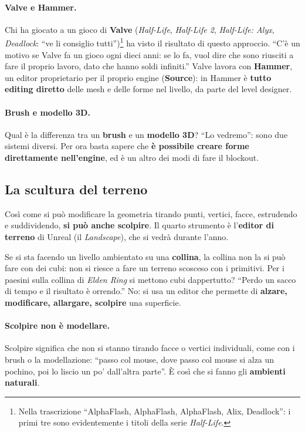\paragraph{Valve e Hammer.} Chi ha giocato a un gioco di \textbf{Valve}
(\emph{Half-Life}, \emph{Half-Life 2}, \emph{Half-Life: Alyx},
\emph{Deadlock}: ``ve li consiglio tutti'')\footnote{Nella trascrizione
``AlphaFlash, AlphaFlash, AlphaFlash, Alix, Deadlock'': i primi tre sono
evidentemente i titoli della serie \emph{Half-Life}.} ha visto il risultato di
questo approccio. ``C'è un motivo se Valve fa un gioco ogni dieci anni: se lo
fa, vuol dire che sono riusciti a fare il proprio lavoro, dato che hanno soldi
infiniti.'' Valve lavora con \textbf{Hammer}, un editor proprietario per il
proprio engine (\textbf{Source}): in Hammer è \textbf{tutto editing diretto}
delle mesh e delle forme nel livello, da parte del level designer.

\paragraph{Brush e modello 3D.} Qual è la differenza tra un \textbf{brush} e un
\textbf{modello 3D}? ``Lo vedremo'': sono due sistemi diversi. Per ora basta
sapere che \textbf{è possibile creare forme direttamente nell'engine}, ed è un
altro dei modi di fare il blockout.

\subsection{La scultura del terreno}
\label{gd11:sec:scultura}

Così come si può modificare la geometria tirando punti, vertici, facce,
estrudendo e suddividendo, \textbf{si può anche scolpire}. Il quarto strumento è
l'\textbf{editor di terreno} di Unreal (il \emph{Landscape}), che si vedrà
durante l'anno.

Se si sta facendo un livello ambientato su una \textbf{collina}, la collina non
la si può fare con dei cubi: non si riesce a fare un terreno scosceso con i
primitivi. Per i paesini sulla collina di \emph{Elden Ring} si mettono cubi
dappertutto? ``Perdo un sacco di tempo e il risultato è orrendo.'' No: si usa un
editor che permette di \textbf{alzare, modificare, allargare, scolpire} una
superficie.

\paragraph{Scolpire non è modellare.} Scolpire significa che non si stanno
tirando facce o vertici individuali, come con i brush o la modellazione: ``passo
col mouse, dove passo col mouse si alza un pochino, poi lo liscio un po'
dall'altra parte''. È così che si fanno gli \textbf{ambienti naturali}.

